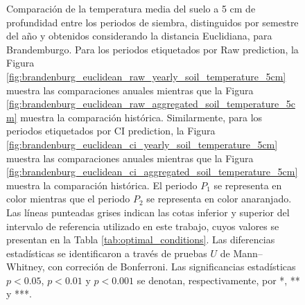 \begin{figure}[htbp]
	\caption{
		Comparación de la temperatura media del suelo a 5 cm de profundidad entre los periodos de siembra, distinguidos por semestre del año y obtenidos considerando la distancia Euclidiana, para Brandemburgo. Para los periodos etiquetados por Raw prediction, la Figura \ref{fig:brandenburg_euclidean_raw_yearly_soil_temperature_5cm} muestra las comparaciones anuales mientras que la Figura \ref{fig:brandenburg_euclidean_raw_aggregated_soil_temperature_5cm} muestra la comparación histórica. Similarmente, para los periodos etiquetados por CI prediction, la Figura \ref{fig:brandenburg_euclidean_ci_yearly_soil_temperature_5cm} muestra las comparaciones anuales mientras que la Figura \ref{fig:brandenburg_euclidean_ci_aggregated_soil_temperature_5cm} muestra la comparación histórica. El periodo $P_1$ se representa en color mientras que el periodo $P_2$ se representa en color anaranjado. Las líneas punteadas grises indican las cotas inferior y superior del intervalo de referencia utilizado en este trabajo, cuyos valores se presentan en la Tabla \ref{tab:optimal_conditions}. Las diferencias estadísticas se identificaron a través de pruebas $U$ de Mann--Whitney, con correción de Bonferroni. Las significancias estadísticas $p<0.05$, $p<0.01$ y $p<0.001$ se denotan, respectivamente, por *, ** y ***.
	}
	\label{fig:brandenburg_euclidean_soil_temperature_5cm}
	
	
\end{figure}



